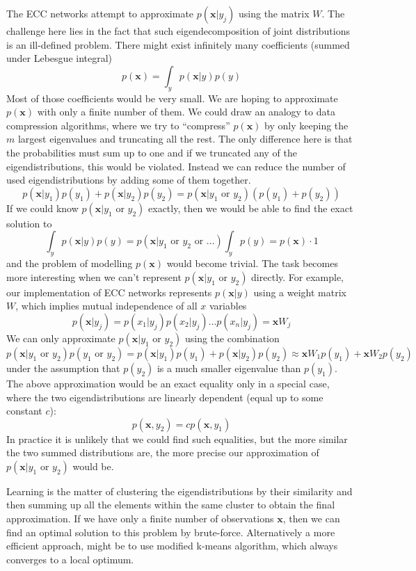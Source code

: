 \documentclass[12pt]{article}
\begin{document}
The ECC networks attempt to approximate $p(\boldsymbol{x}|y_j)$  using the matrix $W$. The challenge here lies in the fact that such eigendecomposition of joint distributions is an ill-defined problem. There might exist infinitely many coefficients (summed under Lebesgue integral)
\[
p(\boldsymbol{x})= \int_y p(\boldsymbol{x}|y) p(y)
\]
Most of those coefficients would be very small. We are hoping to approximate $p(\boldsymbol{x})$ with only a finite number of them. We could draw an analogy to data compression algorithms, where we try to ``compress'' $p(\boldsymbol{x})$ by only keeping the $m$ largest eigenvalues and truncating all the rest. The only difference here is that the probabilities must sum up to one and if we truncated any of the eigendistributions,  this would be violated. Instead we can reduce the number of used eigendistributions by adding some of them together. 
\[
p(\boldsymbol{x}|y_1) p(y_1)+p(\boldsymbol{x}|y_2) p(y_2) = 
p(\boldsymbol{x}|y_1\text{ or }y_2) (p(y_1)+p(y_2))
\]
If we could know $p(\boldsymbol{x}|y_1\text{ or }y_2)$ exactly, then we would be able to find the exact solution to 
\[
\int_y p(\boldsymbol{x}|y) p(y) = p(\boldsymbol{x}| y_1\text{ or }y_2 \text{ or }...)\int_y p(y)= p(\boldsymbol{x}) \cdot 1
\]
and the problem of modelling $p(\boldsymbol{x})$ would become trivial. The task becomes more interesting when we can't represent  $p(\boldsymbol{x}|y_1\text{ or }y_2)$ directly. For example, our implementation of ECC networks represents $p(\boldsymbol{x}|y)$ using a weight matrix $W$, which implies mutual independence of all $x$ variables
\[
p(\boldsymbol{x}|y_j) = p(x_1|y_j)p(x_2|y_j)...p(x_n|y_j) = \boldsymbol{x} W_j
\]
We can only approximate $p(\boldsymbol{x}|y_1\text{ or }y_2)$
using the combination
\[
p(\boldsymbol{x}|y_1\text{ or }y_2) p(y_1\text{ or }y_2)= p(\boldsymbol{x}|y_1) p(y_1)+p(\boldsymbol{x}|y_2) p(y_2) \approx \boldsymbol{x}W_1p(y_1) + \boldsymbol{x}W_2 p(y_2)
\]
under the assumption that $p(y_2)$ is a much smaller eigenvalue than $p(y_1)$.
The above approximation would be an exact equality only in a special case, where the two eigendistributions are linearly dependent (equal up to some constant $c$):
\[p(\boldsymbol{x},y_2)=c p(\boldsymbol{x},y_1)\]
In practice it is unlikely that we could find such equalities, but the more similar the two summed distributions are, the more precise our approximation of $p(\boldsymbol{x}|y_1\text{ or }y_2)$ would be. 

Learning is the matter of clustering the eigendistributions by their similarity and then summing up all the elements within the same cluster to obtain the final approximation. If we have only a finite number of observations $\boldsymbol{x}$, then we can find an optimal solution to this problem by brute-force. Alternatively a more efficient approach, might be to use modified k-means algorithm, which always converges to a local optimum. 
\fi
\end{document}
